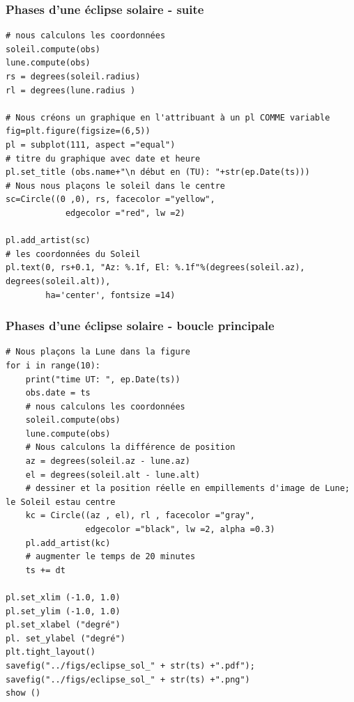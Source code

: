 \documentclass{beamer}
\begin{document}
\begin{frame}
\frametitle{Phases d'une éclipse solaire - suite}

\begin{verbatim}
# nous calculons les coordonnées
soleil.compute(obs)
lune.compute(obs)
rs = degrees(soleil.radius)
rl = degrees(lune.radius )

# Nous créons un graphique en l'attribuant à un pl COMME variable
fig=plt.figure(figsize=(6,5))
pl = subplot(111, aspect ="equal")
# titre du graphique avec date et heure
pl.set_title (obs.name+"\n début en (TU): "+str(ep.Date(ts)))
# Nous nous plaçons le soleil dans le centre
sc=Circle((0 ,0), rs, facecolor ="yellow",
            edgecolor ="red", lw =2)

pl.add_artist(sc)
# les coordonnées du Soleil
pl.text(0, rs+0.1, "Az: %.1f, El: %.1f"%(degrees(soleil.az), degrees(soleil.alt)),
        ha='center', fontsize =14)
\end{verbatim}
\end{frame}

\begin{frame}
\frametitle{Phases d'une éclipse solaire - boucle principale}

\begin{verbatim}
# Nous plaçons la Lune dans la figure
for i in range(10):
    print("time UT: ", ep.Date(ts))
    obs.date = ts
    # nous calculons les coordonnées
    soleil.compute(obs)
    lune.compute(obs)
    # Nous calculons la différence de position
    az = degrees(soleil.az - lune.az)
    el = degrees(soleil.alt - lune.alt)
    # dessiner et la position réelle en empillements d'image de Lune; le Soleil estau centre
    kc = Circle((az , el), rl , facecolor ="gray",
                edgecolor ="black", lw =2, alpha =0.3)
    pl.add_artist(kc)
    # augmenter le temps de 20 minutes
    ts += dt

pl.set_xlim (-1.0, 1.0)
pl.set_ylim (-1.0, 1.0)
pl.set_xlabel ("degré")
pl. set_ylabel ("degré")
plt.tight_layout()
savefig("../figs/eclipse_sol_" + str(ts) +".pdf"); savefig("../figs/eclipse_sol_" + str(ts) +".png")
show ()
\end{verbatim}
\end{frame}
\end{document}
